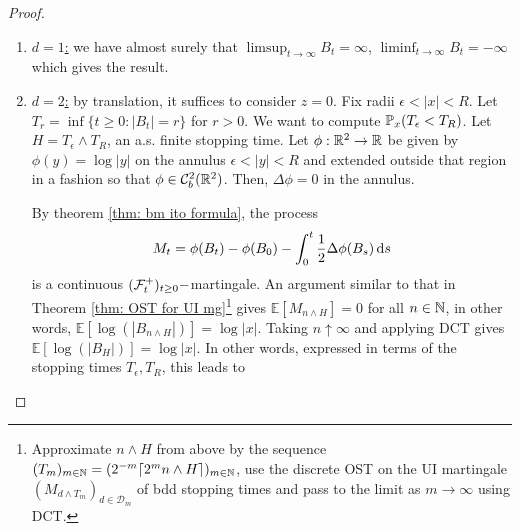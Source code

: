 \documentclass{article}
\begin{document}
\begin{proof}
    \begin{enumerate}
	    \item \underline{$ d=1$:} we have almost surely that $ \displaystyle\limsup_{t\to \infty} B_{t} = \infty$, $ \displaystyle\liminf_{t\to \infty}B_{t} = -\infty$ which gives the result. 
    \item \underline{$ d=2$:} by translation, it suffices to consider $ z = 0$. Fix radii $ \epsilon<|x|<R$. Let $ T_{r} = \displaystyle\inf\{t\geq 0: |B_{t}|=r\}$ for $ r>0$. We want to compute $ \mathbb{P}_{x}(T_{\epsilon}<T_{R})$. Let $ H = T_{\epsilon}\land T_{R}$, an a.s. finite stopping time. Let $ \phi: \mathbb{R}^{2}\to \mathbb{R}$ be given by $ \phi(y) = \log|y|$ on the annulus $ \epsilon<|y|<R$ and extended outside that region in a fashion so that $ \phi\in \mathcal{C}^{2}_{b}(\mathbb{R}^{2})$. Then, $ \Delta\phi = 0$ in the annulus. 
	    \parbox[b]{0.55\textwidth}{ %
	    By theorem \ref{thm: bm ito formula}, the process 
		    \[
		    M_{t} = \phi(B_{t})-\phi(B_{0})- \displaystyle\int^{t}_{0} \frac{1}{2}\Delta \phi(B_{s}) \operatorname{d}\! s  
		    \]
		    is a continuous  $(\mathcal{F}^{+}_{t})_{t\geq 0}-$martingale. An argument similar to that in Theorem \ref{thm: OST for UI mg}\footnote{Approximate $ n\land H$ from above by the sequence $(T_{m})_{m\in\mathbb{N}}=(2^{-m}\lceil 2^m n\land H \rceil)_{m\in \mathbb{N}}$, use the discrete OST on the UI martingale $ (M_{d\land T_{m}})_{d\in \mathcal{ D}_{m}}$ of bdd stopping times and pass to the limit as $ m\to \infty$ using DCT.} gives $\mathbb{E}\left[ M_{n\land H} \right] = 0$ for all $ n\in \mathbb{N}$, in other words, $\mathbb{E}\left[ \log(|B_{n\land H}|) \right]=\log|x| $. Taking $ n\uparrow \infty$ and applying DCT gives $\mathbb{E}\left[ \log(|B_{H}|) \right]=\log|x| $. In other words, expressed in terms of the stopping times $ T_{\epsilon}, T_{R}$, this leads to
}
    \hfill  %
    \parbox[b]{0.4\textwidth}{ %
        \centering
        }
\end{enumerate}
\end{proof}
\end{document}
